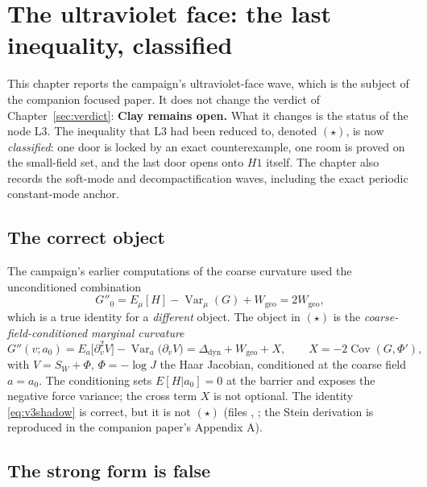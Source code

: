 \section{The ultraviolet face: the last inequality, classified}
\label{ch:uvface}

This chapter reports the campaign's ultraviolet-face wave, which is the subject of the companion
focused paper. It does not change the verdict of Chapter~\ref{sec:verdict}: \textbf{Clay remains
open.} What it changes is the status of the node L3. The inequality that L3 had been reduced to,
denoted $(\star)$, is now \emph{classified}: one door is locked by an exact counterexample, one room
is proved on the small-field set, and the last door opens onto $H1$ itself. The chapter also records
the soft-mode and decompactification waves, including the exact periodic constant-mode anchor.

\subsection{The correct object}

The campaign's earlier computations of the coarse curvature used the unconditioned combination
\begin{equation}
  G''_0=E_\mu[H]-\operatorname{Var}_\mu(G)+W_{\mathrm{geo}}=2W_{\mathrm{geo}},
  \label{eq:v3shadow}
\end{equation}
which is a true identity for a \emph{different} object. The object in $(\star)$ is the
\emph{coarse-field-conditioned marginal curvature}
\begin{equation}
  G''(v;a_0)=E_a\bigl[\partial_v^2V\bigr]-\operatorname{Var}_a\bigl(\partial_vV\bigr)
  =\Delta_{\mathrm{dyn}}+W_{\mathrm{geo}}+X,
  \qquad X=-2\operatorname{Cov}(G,\Phi'),
  \label{eq:v3object}
\end{equation}
with $V=S_W+\Phi$, $\Phi=-\log J$ the Haar Jacobian, conditioned at the coarse field $a=a_0$. The
conditioning sets $E[H|a_0]=0$ at the barrier and exposes the negative force variance; the cross term
$X$ is not optional. The identity \eqref{eq:v3shadow} is correct, but it is not $(\star)$
\LT{} (files , ; the Stein derivation is
reproduced in the companion paper's Appendix A).

\subsection{The strong form is false \LN}

